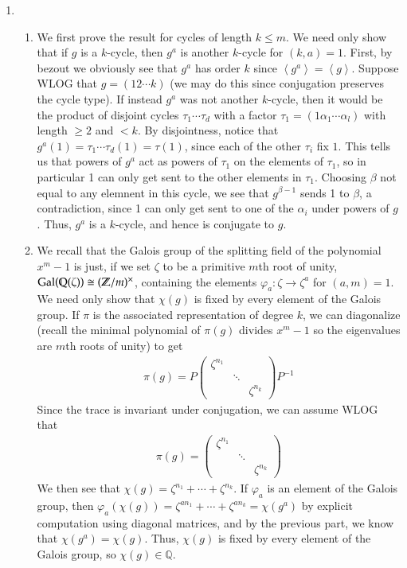 \documentclass[12pt]{article}
\theoremstyle{definitionstyle}
\def\mbb#1{\mathbb{#1}}
\def\cph{\varphi}
\newcommand{\Z}{\mbb Z}
\newcommand{\gen}[1]{\left\langle #1 \right\rangle}
\newcommand{\Q}{\mbb Q}
\newcommand{\Gal}{\mathrm{Gal}\qty}
\begin{document}
\begin{enumerate}
        \item \begin{enumerate}
            \item We first prove the result for cycles of length $k \leq m$. We need only show that if $g$ is a $k$-cycle, then $g^a$ is another $k$-cycle for $(k,a) = 1$. First, by bezout we obviously see that $g^a$ has order $k$ since $\gen{g^a} = \gen{g}$. Suppose WLOG that $g = (1 2 \cdots k)$ (we may do this since conjugation preserves the cycle type). If instead $g^a$ was not another $k$-cycle, then it would be the product of disjoint cycles $\tau_1 \cdots \tau_d$ with a factor $\tau_1 = (1 \alpha_1 \cdots \alpha_l)$ with length $\geq 2$ and $< k$. By disjointness, notice that $g^a(1)= \tau_1 \cdots \tau_d(1) = \tau(1)$, since each of the other $\tau_i$ fix $1$. This tells us that powers of $g^a$ act as powers of $\tau_1$ on the elements of $\tau_1$, so in particular 1 can only get sent to the other elements in $\tau_1$. Choosing $\beta$ not equal to any elemnent in this cycle, we see that $g^{\beta-1}$ sends 1 to $\beta$, a contradiction, since 1 can only get sent to one of the $\alpha_i$ under powers of $g$. Thus, $g^a$ is a $k$-cycle, and hence is conjugate to $g$.
            
            \item We recall that the Galois group of the splitting field of the polynomial $x^m-1$ is just, if we set $\zeta$ to be a primitive $m$th root of unity, $\Gal(\Q(\zeta)) \cong (\Z/m)^\times$, containing the elements $\cph_a: \zeta \to \zeta^a$ for $(a, m) = 1$. We need only show that $\chi(g)$ is fixed by every element of the Galois group. If $\pi$ is the associated representation of degree $k$, we can diagonalize (recall the minimal polynomial of $\pi(g)$ divides $x^m-1$ so the eigenvalues are $m$th roots of unity) to get
            \begin{align*}
                \pi(g) = P \begin{pmatrix} \zeta^{n_1} & & \\ & \ddots & \\ & & \zeta^{n_k} \end{pmatrix} P^{-1}
            \end{align*}
            Since the trace is invariant under conjugation, we can assume WLOG that 
            \begin{align*}
                \pi(g) = \begin{pmatrix} \zeta^{n_1} & & \\ & \ddots & \\ & & \zeta^{n_k} \end{pmatrix}
            \end{align*}
            We then see that $\chi(g) = \zeta^{n_1} + \cdots + \zeta^{n_k}$. If $\cph_a$ is an element of the Galois group, then $\cph_a(\chi(g)) = \zeta^{an_1} + \cdots + \zeta^{an_k} = \chi(g^a)$ by explicit computation using diagonal matrices, and by the previous part, we know that $\chi(g^a) = \chi(g)$. Thus, $\chi(g)$ is fixed by every element of the Galois group, so $\chi(g) \in \Q$.


\end{enumerate}
\end{enumerate}
\end{document}
